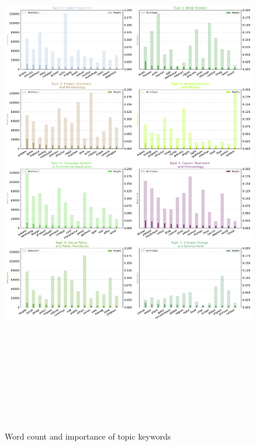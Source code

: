 %
\begin{figure}[H]
    \centering
    \includegraphics[width = 17cm, height = 24cm]{./img/word_count_and_importance_of_topic_keywords.pdf}
    \caption{Word count and importance of topic keywords}
\end{figure}
